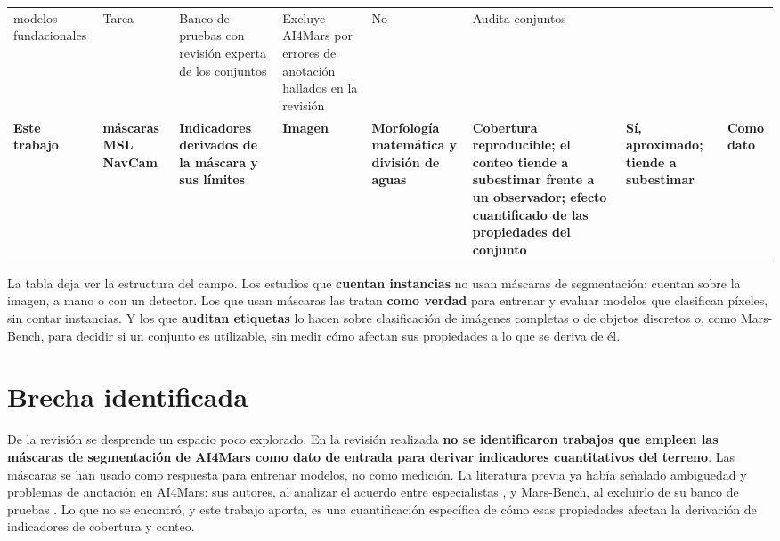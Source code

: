 \begin{landscape}
\begin{spacing}{1}
\begin{longtable}{@{}L{2.6cm}L{2.9cm}L{3.0cm}L{1.4cm}L{3.1cm}L{3.8cm}L{1.6cm}L{1.6cm}@{}}
    modelos fundacionales & Tarea & Banco de pruebas con revisión experta de los conjuntos &
    Excluye AI4Mars por errores de anotación hallados en la revisión & No & Audita
    conjuntos \\
  \textbf{Este trabajo} & \textbf{\cNEscenas{} máscaras MSL NavCam} &
    \textbf{Indicadores derivados de la máscara y sus límites} & \textbf{Imagen} &
    \textbf{Morfología matemática y división de aguas} & \textbf{Cobertura reproducible; el conteo
    tiende a subestimar frente a un observador; efecto cuantificado de las propiedades del conjunto} &
    \textbf{Sí, aproximado; tiende a subestimar} & \textbf{Como dato} \\
\end{longtable}
\end{spacing}
\end{landscape}

La tabla deja ver la estructura del campo. Los estudios que \textbf{cuentan instancias} no usan
máscaras de segmentación: cuentan sobre la imagen, a mano o con un detector. Los que usan
máscaras las tratan \textbf{como verdad} para entrenar y evaluar modelos que clasifican
píxeles, sin contar instancias. Y los que \textbf{auditan etiquetas} lo hacen sobre
clasificación de imágenes completas o de objetos discretos o, como Mars-Bench, para decidir si
un conjunto es utilizable, sin medir cómo afectan sus propiedades a lo que se deriva de él.

\section{Brecha identificada}
\label{sec:brecha}

De la revisión se desprende un espacio poco explorado. En la revisión realizada \textbf{no se
identificaron trabajos que empleen las máscaras de segmentación de AI4Mars como dato de entrada
para derivar indicadores cuantitativos del terreno}. Las máscaras se han usado como respuesta
para entrenar modelos, no como medición. La literatura previa ya había señalado ambigüedad y
problemas de anotación en AI4Mars: sus autores, al analizar el acuerdo entre especialistas
\citep{swan2021ai4mars}, y Mars-Bench, al excluirlo de su banco de pruebas
\citep{purohit2025marsbench}. Lo que no se encontró, y este trabajo aporta, es una
cuantificación específica de cómo esas propiedades afectan la derivación de indicadores de
cobertura y conteo.

